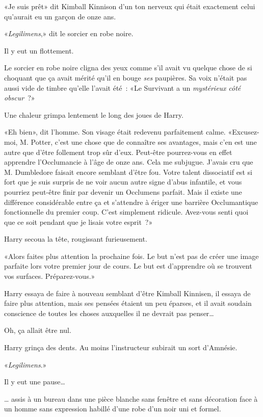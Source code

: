 «Je suis prêt» dit Kimball Kinnison d'un ton nerveux qui était exactement celui qu'aurait eu un garçon de onze ans.

«\emph{Legilimens},» dit le sorcier en robe noire.

Il y eut un flottement.

Le sorcier en robe noire cligna des yeux comme s'il avait vu quelque chose de si choquant que ça avait mérité qu'il en bouge \emph{ses} paupières. Sa voix n'était pas aussi vide de timbre qu'elle l'avait été~: «Le Survivant a un \emph{mystérieux} \emph{côté obscur}~?»

Une chaleur grimpa lentement le long des joues de Harry.

«Eh bien», dit l'homme. Son visage était redevenu parfaitement calme. «Excusez-moi, M. Potter, c'est une chose que de connaître ses avantages, mais c'en est une autre que d'être follement trop sûr d'eux. Peut-être pourrez-vous en effet apprendre l'Occlumancie à l'âge de onze ans. Cela me subjugue. J'avais cru que M. Dumbledore faisait encore semblant d'être fou. Votre talent dissociatif est si fort que je suis surpris de ne voir aucun autre signe d'abus infantile, et vous pourriez peut-être finir par devenir un Occlumens parfait. Mais il existe une différence considérable entre ça et s'attendre à ériger une barrière Occlumantique fonctionnelle du premier coup. C'est simplement ridicule. Avez-vous senti quoi que ce soit pendant que je lisais votre esprit~?»

Harry secoua la tête, rougissant furieusement.

«Alors faites plus attention la prochaine fois. Le but n'est pas de créer une image parfaite lors votre premier jour de cours. Le but est d'apprendre où se trouvent vos surfaces. Préparez-vous.»

Harry essaya de faire à nouveau semblant d'être Kimball Kinnisen, il essaya de faire plus attention, mais ses pensées étaient un peu éparses, et il avait soudain conscience de toutes les choses auxquelles il ne devrait pas penser…

Oh, ça allait être nul.

Harry grinça des dents. Au moins l'instructeur subirait un sort d'Amnésie.

«\emph{Legilimens}.»

Il y eut une pause…

… assis à un bureau dans une pièce blanche sans fenêtre et sans décoration face à un homme sans expression habillé d’une robe d'un noir uni et formel.

